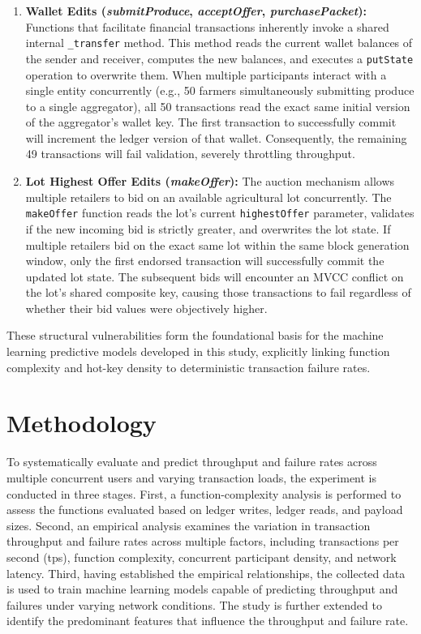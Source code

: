 ﻿\documentclass[12pt]{article}
\begin{document}
\begin{enumerate}
    \item \textbf{Wallet Edits (\textit{submitProduce}, \textit{acceptOffer}, \textit{purchasePacket}):} Functions that facilitate financial transactions inherently invoke a shared internal \texttt{\_transfer} method. This method reads the current wallet balances of the sender and receiver, computes the new balances, and executes a \texttt{putState} operation to overwrite them. When multiple participants interact with a single entity concurrently (e.g., 50 farmers simultaneously submitting produce to a single aggregator), all 50 transactions read the exact same initial version of the aggregator's wallet key. The first transaction to successfully commit will increment the ledger version of that wallet. Consequently, the remaining 49 transactions will fail validation, severely throttling throughput.
    
    \item \textbf{Lot Highest Offer Edits (\textit{makeOffer}):} The auction mechanism allows multiple retailers to bid on an available agricultural lot concurrently. The \texttt{makeOffer} function reads the lot's current \texttt{highestOffer} parameter, validates if the new incoming bid is strictly greater, and overwrites the lot state. If multiple retailers bid on the exact same lot within the same block generation window, only the first endorsed transaction will successfully commit the updated lot state. The subsequent bids will encounter an MVCC conflict on the lot's shared composite key, causing those transactions to fail regardless of whether their bid values were objectively higher.
\end{enumerate}

These structural vulnerabilities form the foundational basis for the machine learning predictive models developed in this study, explicitly linking function complexity and hot-key density to deterministic transaction failure rates.


\section{Methodology}

To systematically evaluate and predict throughput and failure rates across multiple concurrent users and varying transaction loads, the experiment is conducted in three stages. First, a function-complexity analysis is performed to assess the functions evaluated based on ledger writes, ledger reads, and payload sizes. Second, an empirical analysis examines the variation in transaction throughput and failure rates across multiple factors, including transactions per second (tps), function complexity, concurrent participant density, and network latency. Third, having established the empirical relationships, the collected data is used to train machine learning models capable of predicting throughput and failures under varying network conditions. The study is further extended to identify the predominant features that influence the throughput and failure rate. 
\end{document}
